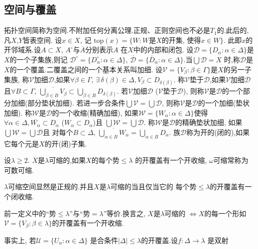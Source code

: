 \documentclass[main.tex]{subfiles}
\begin{document}
\subsection{空间与覆盖}\label{ch1.1.2}
拓扑空间简称为空间.不附加任何分离公理.正规、正则空间也不必是$T_1$的.此后的,凡$X$,$Y$皆表空间.
设$x\in X$, 记
$\textrm{top}(x) = \{W: W$是$X$的开集, 使得$ x\in W\}$.
此即$x$的开邻域系.设$A\subset X$, $A^\circ$与$\overline{A}$分别表示$A$ 在$X$中的内部和闭包.
设$\mathscr{D}=\{D_\alpha:\alpha\in\Delta\}$是$X$的一个子集族,则记
$\mathscr{D}^\circ=\{D^\circ_\alpha:\alpha\in\Delta\}$,
$\overline{\mathscr{D}}=\{\overline{D}_\alpha:\alpha\in\Delta\}$.当$\bigcup\mathscr{D} = X$
时,称$\mathscr{D}$是$X$的一个覆盖.二覆盖之间的一个基本关系叫加细.
设$\mathscr{V}=\{V_\beta:\beta\in\Gamma\}$是$X$的另一子集族,
称$\mathscr{V}$加细$\mathscr{D}$,如果$\forall\beta\in\Gamma$, 
$\exists\, \delta (\beta)\in\Delta, V_\beta\subset D_{\delta(\beta)}$.
称$\mathscr{V}$垫于$\mathscr{D}$,如果$\mathscr{V}$加细$\mathscr{D}$
且$\forall B\subset\Gamma$, 
$\overline{\bigcup_{\beta\in B}V_\beta}\subset \bigcup_{\beta\in B}D_{\delta(\beta)}$.
若$\mathscr{V}$加细$\mathscr{D}$
($\mathscr{V}$垫于$\mathscr{D}$),
则称$\mathscr{V}$是$\mathscr{D}$的一个部分加细(部分垫状加细).
若进一步合条件$\bigcup\mathscr{V}=\bigcup\mathscr{D}$,
则称$\mathscr{V}$是$\mathscr{D}$的一个加细(垫状加细).
称$\mathscr{W}$是$\mathscr{D}$的一个收缩(精确加细),
如果$\mathscr{W}=\{W_\alpha: \alpha\in\Delta\}$使得
$\forall\alpha\in \Delta, \overline{W_\alpha}\subset D_\alpha$
($W_\alpha\subset D_\alpha$)且
$\bigcup\mathscr{W}  = \bigcup \mathscr{D}$.
称$\mathscr{W}$是$\mathscr{D}$的精确垫状加细,
如果$\bigcup\mathscr{W}  = \bigcup \mathscr{D}$且
对每个$B\subset \Delta$, 
$\overline{\bigcup_{\alpha\in B}W_\alpha}  = \bigcup_{\alpha\in B}D_\alpha$.
族$\mathscr{D}$称为开的(闭的),如果它每个元是$X$的开(闭)子集.

\begin{definition}
设$\lambda \ge2$. $X$是$\lambda$可缩的,如果$X$的每个势$\le \lambda$
的开覆盖有一个开收缩, $\omega$可缩常称为可数可缩.
\end{definition}
$\lambda$可缩空间显然是正规的.并且$X$是$\lambda$可缩的当且仅当它的
每个势$\le \lambda$的开覆盖有一个闭收缩.

\begin{note}\begin{songti}
前一定义中的“势$\le \lambda$”与“势$= \lambda$”等价.换言之,
$X$是$\lambda$可缩的 $\Leftrightarrow X$的每一个形如
$\mathscr{V}=\{V_\beta: \beta\in\lambda\}$的开覆盖有一个开收缩. 

事实上, 若$\mathscr{U}=\{U_\alpha: \alpha\in\Delta\}$
是合条件$|\Delta|\le\lambda$的开覆盖.设$f: \Delta\to\lambda$
是双射
\end{songti}
\end{note}
\end{document}
